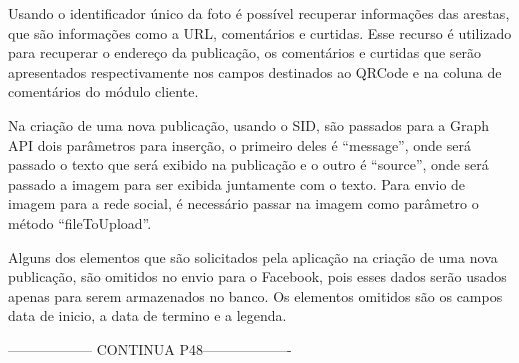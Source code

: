 Usando o identificador único da foto é possível recuperar informações das arestas, que são informações como a URL, comentários e curtidas. Esse recurso é utilizado para recuperar o endereço da publicação, os comentários e curtidas que serão apresentados respectivamente nos campos destinados ao QRCode e na coluna de comentários do módulo cliente.

Na criação de uma nova publicação, usando o SID, são passados para a Graph API dois parâmetros para inserção, o primeiro deles é “message”, onde será passado o texto que será exibido na publicação e o outro é “source”, onde será passado a imagem para ser exibida juntamente com o texto. Para envio de imagem para a rede social, é necessário passar na imagem como parâmetro o método “fileToUpload”. 

Alguns dos elementos que são solicitados pela aplicação na criação de uma nova publicação, são omitidos no envio para o Facebook, pois esses dados serão usados apenas para serem armazenados no banco. Os elementos omitidos são os campos data de inicio, a data de termino e a legenda. 

------------------ CONTINUA  P48-------------------